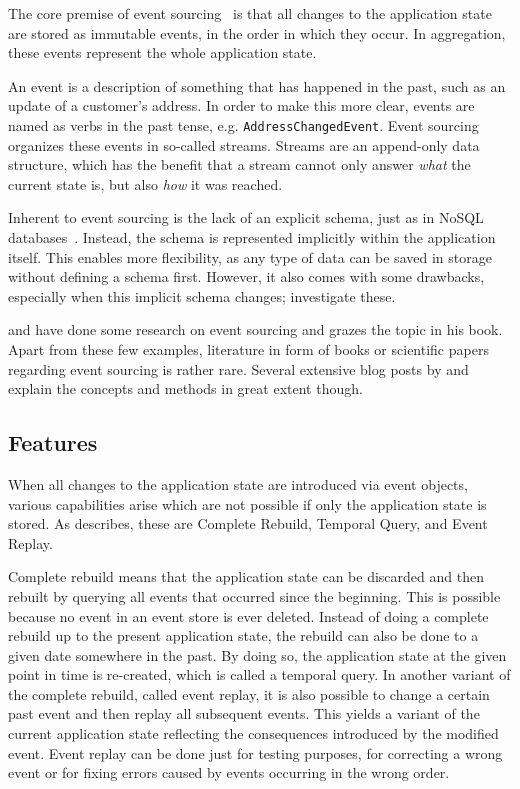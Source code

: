 The core premise of event sourcing~\cite{WEB:Fowler:2005} is that all changes to the application state are stored as immutable events, in the order in which they occur.
In aggregation, these events represent the whole application state.

An event is a description of something that has happened in the past, such as an update of a customer's address.
In order to make this more clear, events are named as verbs in the past tense, e.g. \texttt{AddressChangedEvent}.
Event sourcing organizes these events in so-called streams.
Streams are an append-only data structure, which has the benefit that a stream cannot only answer \emph{what} the current state is, but also \emph{how} it was reached.

Inherent to event sourcing is the lack of an explicit schema, just as in NoSQL databases~\cite{fowler2013schemaless}.
Instead, the schema is represented implicitly within the application itself.
This enables more flexibility, as any type of data can be saved in storage without defining a schema first.
However, it also comes with some drawbacks, especially when this implicit schema changes; \citet{Overeem2017} investigate these.

\citet{Overeem2017} and \citet{Erb2016} have done some research on event sourcing and \citet{evans2004domain} grazes the topic in his book.
Apart from these few examples, literature in form of books or scientific papers regarding event sourcing is rather rare.
Several extensive blog posts by \citet{WEB:Fowler:2005} and \citet{young2010whyeventsourcing} explain the concepts and methods in great extent though.

\subsection{Features}

When all changes to the application state are introduced via event objects, various capabilities arise which are not possible if only the application state is stored.
As \citet{WEB:Fowler:2005} describes, these are Complete Rebuild, Temporal Query, and Event Replay.

Complete rebuild means that the application state can be discarded and then rebuilt by querying all events that occurred since the beginning.
This is possible because no event in an event store is ever deleted.
Instead of doing a complete rebuild up to the present application state, the rebuild can also be done to a given date somewhere in the past.
By doing so, the application state at the given point in time is re-created, which is called a temporal query.
In another variant of the complete rebuild, called event replay, it is also possible to change a certain past event and then replay all subsequent events.
This yields a variant of the current application state reflecting the consequences introduced by the modified event.
Event replay can be done just for testing purposes, for correcting a wrong event or for fixing errors caused by events occurring in the wrong order.

